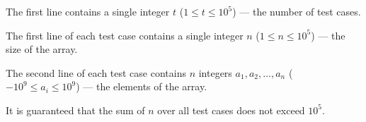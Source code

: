 The first line contains a single integer $t$ ($1 \le t \le 10^5$) --- the number of test cases.

The first line of each test case contains a single integer $n$ ($1 \le n \le 10^5$) --- the size of the array.

The second line of each test case contains $n$ integers $a_1, a_2, \ldots, a_n$ ($-10^9 \le a_i \le 10^9$) --- the elements of the array.

It is guaranteed that the sum of $n$ over all test cases does not exceed $10^5$.
